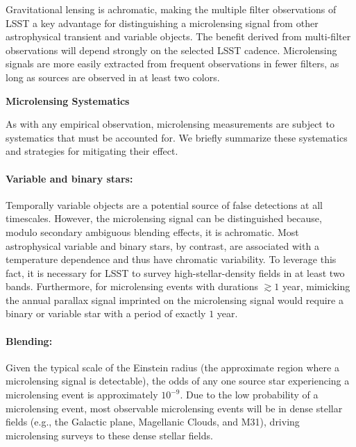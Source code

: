 

Gravitational lensing is achromatic, making the multiple filter observations of LSST a key advantage for distinguishing a microlensing signal from other astrophysical transient and variable objects.
The benefit derived from multi-filter observations will depend strongly on the selected LSST cadence. 
Microlensing signals are more easily extracted from frequent observations in fewer filters, as long as sources are observed in at least two colors. 


\noindent \textbf{Microlensing Systematics}

As with any empirical observation, microlensing measurements are subject to systematics that must be accounted for.
We briefly summarize these systematics and strategies for mitigating their effect.

\paragraph{Variable and binary stars:} Temporally variable objects are a potential source of false detections at all timescales. However, the microlensing signal can be distinguished because, modulo secondary ambiguous blending effects, it is achromatic. Most astrophysical variable and binary stars, by contrast, are associated with a temperature dependence and thus have chromatic variability. To leverage this fact, it is necessary for LSST to survey high-stellar-density fields in at least two bands. Furthermore, for microlensing events with durations $\gtrsim 1$ year, mimicking the annual parallax signal imprinted on the microlensing signal would require a binary or variable star with a period of exactly $1$ year.

\paragraph{Blending:} Given the typical scale  of the Einstein radius (the approximate region where a microlensing signal is detectable), the odds of any one source star experiencing a microlensing event is approximately $10^{-9}$. Due to the low probability of a microlensing event, most observable microlensing events will be in dense stellar fields (e.g., the Galactic plane, Magellanic Clouds, and M31), driving microlensing surveys to these dense stellar fields.

